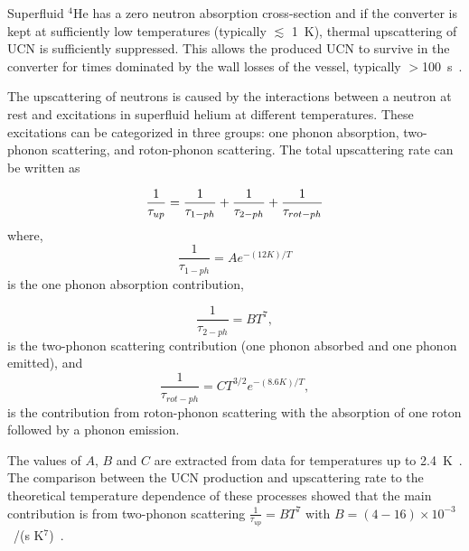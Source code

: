 

Superfluid $^4$He has a zero neutron absorption cross-section and if
the converter is kept at sufficiently low temperatures (typically
$\lesssim$ 1~K), thermal upscattering of UCN is sufficiently
suppressed. This allows the produced UCN to survive in the converter
for times dominated by the wall losses of the vessel, typically
$>$100~s~\cite{Leung2016}.

The upscattering of neutrons is caused by the interactions between a
neutron at rest and excitations in superfluid helium at different
temperatures. These excitations can be categorized in three groups:
one phonon absorption, two-phonon scattering, and roton-phonon
scattering.  The total upscattering rate can be written as

\begin{equation}
\label{eqn:hE_{UCN}pscattering}
\frac{1}{\tau_{up}} =
\frac{1}{\tau_{1-ph}}+\frac{1}{\tau_{2-ph}}+\frac{1}{\tau_{rot-ph}}
\end{equation}
where,
\begin{equation}
\label{eqn:1ph}
\frac{1}{\tau_{1-ph}}= A e^{-(12 K)/T}
\end{equation}
is the one phonon absorption contribution, 

\begin{equation}
\label{eqn:2ph}
\frac{1}{\tau_{2-ph}}= BT^7,
\end{equation}
is the two-phonon scattering contribution (one phonon absorbed and one
phonon emitted), and
\begin{equation}
\label{eqn:ph-rtn}
\frac{1}{\tau_{rot-ph}}= CT^{3/2}e^{-(8.6 K)/T},
\end{equation}
is the contribution from roton-phonon scattering with the absorption
of one roton followed by a phonon emission.

The values of $A$, $B$ and $C$ are extracted from data for
temperatures up to 2.4~K~\cite{Leung2016}. The comparison between
the UCN production and upscattering rate to the theoretical
temperature dependence of these processes showed that the main
contribution is from two-phonon scattering $\frac{1}{\tau_{up}}=BT^7$
with $B=(4-16)\times 10^{-3}$~/(s K$^7$)~\cite{Leung2016}.


